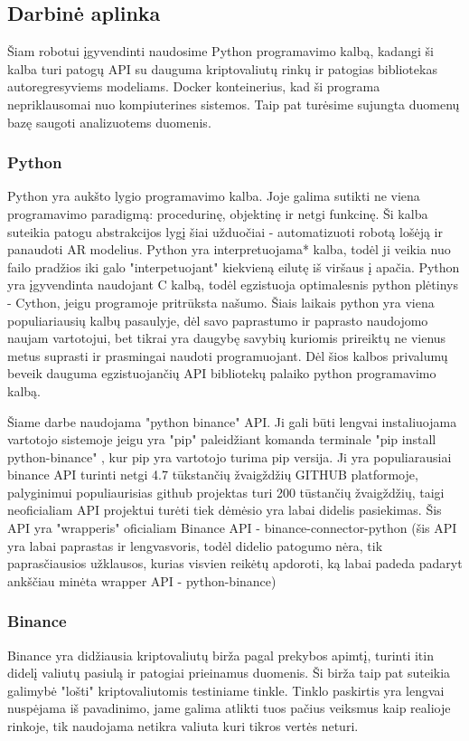 \documentclass{VUMIFInfKursinis}
\begin{document}
\subsection{Darbinė aplinka}
Šiam robotui įgyvendinti naudosime Python programavimo kalbą, kadangi ši kalba turi patogų API su dauguma kriptovaliutų rinkų ir patogias bibliotekas autoregresyviems modeliams.
Docker konteinerius, kad ši programa nepriklausomai nuo kompiuterines sistemos. Taip pat turėsime sujungta duomenų
bazę saugoti analizuotems duomenis. 

\subsubsection{Python}
Python yra aukšto lygio programavimo kalba. Joje galima sutikti ne viena programavimo paradigmą: procedurinę, objektinę ir netgi funkcinę.
Ši kalba suteikia patogu abstrakcijos lygį šiai užduočiai - automatizuoti robotą lošėją ir panaudoti AR modelius.
Python yra interpretuojama* kalba, todėl ji veikia nuo failo pradžios iki galo "interpetuojant" kiekvieną eilutę iš viršaus į apačia. %
Python yra įgyvendinta naudojant C kalbą, todėl egzistuoja optimalesnis python plėtinys - Cython, jeigu programoje pritrūksta našumo. Šiais laikais
python yra viena populiariausių kalbų pasaulyje, dėl savo paprastumo ir paprasto naudojomo naujam vartotojui, bet tikrai yra daugybę savybių
kuriomis prireiktų ne vienus metus suprasti ir prasmingai naudoti programuojant. Dėl šios kalbos privalumų beveik dauguma egzistuojančių API
bibliotekų palaiko python programavimo kalbą.


Šiame darbe naudojama "python binance" API. Ji gali būti lengvai instaliuojama vartotojo sistemoje jeigu yra "pip" paleidžiant komanda terminale "pip install python-binance"
, kur pip yra vartotojo turima pip versija. Ji yra populiarausiai binance API turinti netgi 4.7 tūkstančių žvaigždžių GITHUB platformoje\cite{DokTest}, palyginimui populiaurisias github projektas turi
200 tūstančių žvaigždžių, taigi neoficialiam API projektui turėti tiek dėmėsio yra labai didelis pasiekimas. Šis API yra "wrapperis" oficialiam Binance 
API - binance-connector-python (šis API yra labai paprastas ir lengvasvoris, todėl didelio patogumo nėra, tik paprasčiausios užklausos, kurias visvien
reikėtų apdoroti, ką labai padeda padaryt ankščiau minėta wrapper API - python-binance)  

\subsubsection{Binance}
Binance yra didžiausia kriptovaliutų birža pagal prekybos apimtį, turinti itin didelį valiutų pasiulą ir patogiai prieinamus duomenis. Ši birža taip pat
suteikia galimybė "lošti" kriptovaliutomis testiniame tinkle. Tinklo paskirtis yra lengvai nuspėjama iš pavadinimo, jame galima atlikti tuos pačius 
veiksmus kaip realioje rinkoje, tik naudojama netikra valiuta kuri tikros vertės neturi. 
\end{document}
